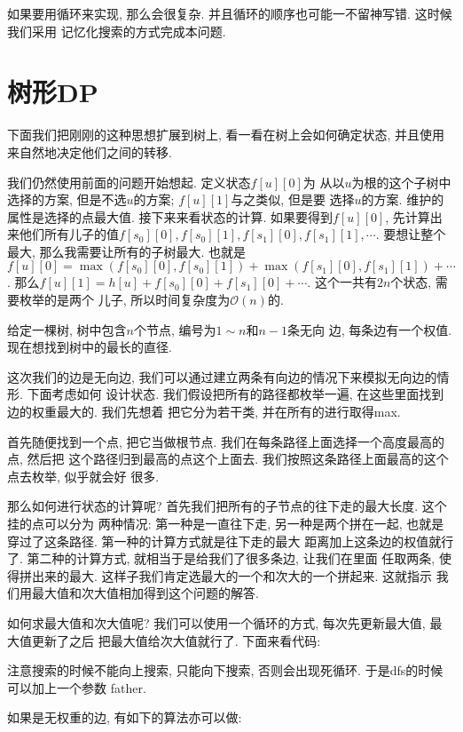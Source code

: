 如果要用循环来实现, 那么会很复杂. 并且循环的顺序也可能一不留神写错. 这时候我们采用
记忆化搜索的方式完成本问题. 

\section{树形DP}

下面我们把刚刚的这种思想扩展到树上, 看一看在树上会如何确定状态, 并且使用
来自然地决定他们之间的转移. 

 我们仍然使用前面的问题开始想起. 定义状态$f[u][0]$为 
从以$u$为根的这个子树中选择的方案, 但是不选$u$的方案; $f[u][1]$与之类似, 但是要
选择$u$的方案. 维护的属性是选择的点最大值. 接下来来看状态的计算. 如果要得到$f[u][0]$, 
先计算出来他们所有儿子的值$f[s_0][0], f[s_0][1], f[s_1][0], f[s_1][1],\cdots$. 
要想让整个最大, 那么我需要让所有的子树最大. 也就是
$f[u][0]=\max(f[s_0][0], f[s_0][1])+\max(f[s_1][0], f[s_1][1])+\cdots$.
那么$f[u][1]=h[u]+f[s_0][0]+f[s_1][0]+\cdots$. 这个一共有$2n$个状态, 需要枚举的是两个
儿子, 所以时间复杂度为$\mathcal O(n)$的.  

 给定一棵树, 树中包含$n$个节点, 编号为$1\sim n$和$n-1$条无向
边, 每条边有一个权值. 现在想找到树中的最长的直径. 

这次我们的边是无向边, 我们可以通过建立两条有向边的情况下来模拟无向边的情形. 下面考虑如何 
设计状态. 我们假设把所有的路径都枚举一遍, 在这些里面找到边的权重最大的. 我们先想着
把它分为若干类, 并在所有的进行取得max. 

首先随便找到一个点, 把它当做根节点. 我们在每条路径上面选择一个高度最高的点, 然后把
这个路径归到最高的点这个上面去. 我们按照这条路径上面最高的这个点去枚举, 似乎就会好
很多. 

那么如何进行状态的计算呢? 首先我们把所有的子节点的往下走的最大长度. 这个挂的点可以分为
两种情况: 第一种是一直往下走, 另一种是两个拼在一起, 也就是穿过了这条路径. 
第一种的计算方式就是往下走的最大
距离加上这条边的权值就行了. 第二种的计算方式, 就相当于是给我们了很多条边, 让我们在里面
任取两条, 使得拼出来的最大. 这样子我们肯定选最大的一个和次大的一个拼起来. 这就指示
我们用最大值和次大值相加得到这个问题的解答. 

如何求最大值和次大值呢? 我们可以使用一个循环的方式, 每次先更新最大值, 最大值更新了之后
把最大值给次大值就行了. 下面来看代码: 

注意搜索的时候不能向上搜索, 只能向下搜索, 否则会出现死循环. 于是dfs的时候可以加上一个参数
father.  

如果是无权重的边, 有如下的算法亦可以做: 

